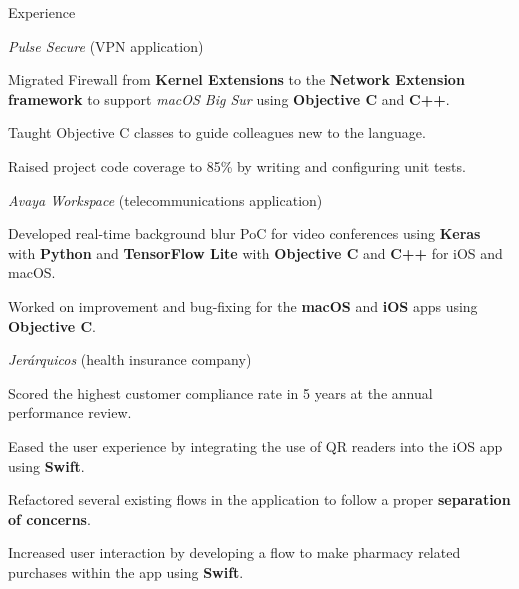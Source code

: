\documentclass{curriculum}
\begin{document}
\begin{cvsection}{Experience}
\begin{sectionitemlist}
        \item{\textit{Pulse Secure} (VPN application)}
            \begin{sectionitemlist}
            \item{
                Migrated Firewall from \textbf{Kernel Extensions} to the
                \textbf{Network Extension framework} to support \textit{macOS Big Sur}
                using \textbf{Objective C} and \textbf{C++}.
            }
            \item{
                Taught Objective C classes to guide colleagues new to the language.
            }
            \item{
                Raised project code coverage to 85\% by writing and configuring unit tests.
            }
            \end{sectionitemlist}

        \item{\textit{Avaya Workspace} (telecommunications application)}
            \begin{sectionitemlist}
            \item{
                Developed real-time background blur PoC for video conferences using
                \textbf{Keras} with \textbf{Python} and \textbf{TensorFlow Lite}
                with \textbf{Objective C} and \textbf{C++} for iOS and macOS.
            }
            \item{
                Worked on improvement and bug-fixing for the \textbf{macOS}
                and \textbf{iOS} apps using \textbf{Objective C}.
            }
            \end{sectionitemlist}

        \item{\textit{Jerárquicos} (health insurance company)}
            \begin{sectionitemlist}
            \item{
                Scored the highest customer compliance rate
                in 5 years at the annual performance review.
            }
            \item{
                Eased the user experience by integrating the use of
                QR readers into the iOS app using \textbf{Swift}.
            }
            \item{
                Refactored several existing flows in the application
                to follow a proper \textbf{separation of concerns}.
            }
            \item {
                Increased user interaction by developing a flow to make pharmacy
                related purchases within the app using \textbf{Swift}.
            }
            \end{sectionitemlist}


\end{sectionitemlist}
\end{cvsection}
\end{document}

